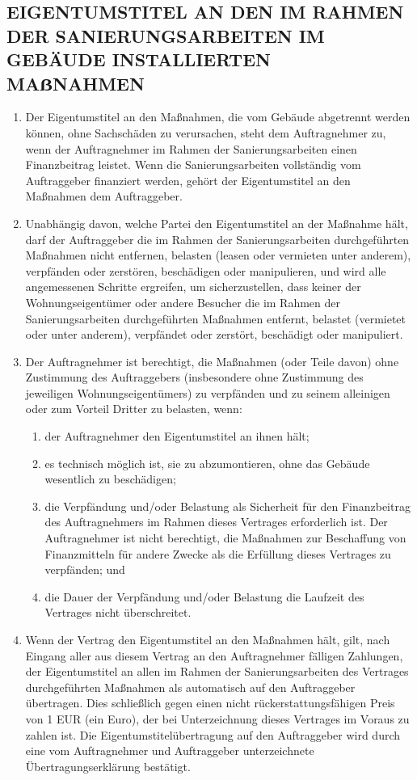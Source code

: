 \begin{multicols}{2}
   \subsection{EIGENTUMSTITEL AN DEN IM RAHMEN DER SANIERUNGSARBEITEN IM GEBÄUDE INSTALLIERTEN MAẞNAHMEN}
   \begin{enumerate}
   \item Der Eigentumstitel an den Maßnahmen, die vom Gebäude abgetrennt werden können, ohne Sachschäden zu verursachen, steht dem Auftragnehmer zu, wenn der Auftragnehmer im Rahmen der Sanierungsarbeiten einen Finanzbeitrag leistet. Wenn die Sanierungsarbeiten vollständig vom Auftraggeber finanziert werden, gehört der Eigentumstitel an den Maßnahmen dem Auftraggeber.
   \item Unabhängig davon, welche Partei den Eigentumstitel an der Maßnahme hält, darf der Auftraggeber die im Rahmen der Sanierungsarbeiten durchgeführten Maßnahmen nicht entfernen, belasten (leasen oder vermieten unter anderem), verpfänden oder zerstören, beschädigen oder manipulieren, und wird alle angemessenen Schritte ergreifen, um sicherzustellen, dass keiner der Wohnungseigentümer oder andere Besucher die im Rahmen der Sanierungsarbeiten durchgeführten Maßnahmen entfernt, belastet (vermietet oder unter anderem), verpfändet oder zerstört, beschädigt oder manipuliert.
   \item Der Auftragnehmer ist berechtigt, die Maßnahmen (oder Teile davon) ohne Zustimmung des Auftraggebers (insbesondere ohne Zustimmung des jeweiligen Wohnungseigentümers) zu verpfänden und zu seinem alleinigen oder zum Vorteil Dritter zu belasten, wenn:
   \begin{enumerate}
   \item der Auftragnehmer den Eigentumstitel an ihnen  hält;
   \item es technisch möglich ist, sie zu abzumontieren, ohne das Gebäude wesentlich zu beschädigen;
   \item die Verpfändung und/oder Belastung als Sicherheit für den Finanzbeitrag des Auftragnehmers im Rahmen dieses Vertrages erforderlich ist. Der Auftragnehmer ist nicht berechtigt, die Maßnahmen zur Beschaffung von Finanzmitteln für andere Zwecke als die Erfüllung dieses Vertrages zu verpfänden; und
   \item die Dauer der Verpfändung und/oder Belastung die Laufzeit des Vertrages nicht überschreitet.
   \end{enumerate}
     \item Wenn der Vertrag den Eigentumstitel an den Maßnahmen hält, gilt, nach Eingang aller aus diesem Vertrag an den Auftragnehmer fälligen Zahlungen, der Eigentumstitel an allen im Rahmen der Sanierungsarbeiten des Vertrages durchgeführten Maßnahmen als automatisch auf den Auftraggeber übertragen. Dies schließlich gegen einen nicht rückerstattungsfähigen Preis von 1 EUR (ein Euro), der bei Unterzeichnung dieses Vertrages im Voraus zu zahlen ist. Die Eigentumstitelübertragung auf den Auftraggeber wird durch eine vom Auftragnehmer und Auftraggeber unterzeichnete Übertragungserklärung bestätigt.
   \end{enumerate}


\end{multicols}
